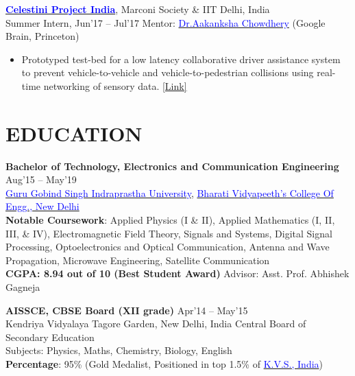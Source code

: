 \documentclass[11pt]{res} %
\newcommand{\titlegap}{5pt} %
\newcommand{\sectgap}{0.05in} %
\begin{document}
\begin{resume}
\vspace{-0.1cm}
\href{https://www.marconisociety.org/programs-services/}{\textbf{\textcolor{blue}{Celestini Project India}}}, Marconi Society \& IIT Delhi, India\\
Summer Intern, Jun'17 – Jul'17 \hfill Mentor: \href{https://achowdhery.github.io/achowdhery-website/index.html}{\textcolor{blue}{Dr.Aakanksha Chowdhery}} (Google Brain, Princeton)
\begin{itemize}
\item Prototyped test-bed for a low latency collaborative driver assistance system to prevent vehicle-to-vehicle and vehicle-to-pedestrian collisions using real-time networking of sensory data. \textcolor{blue}{\href{https://bhartischool.iitd.ac.in/pdf/7thISSUEnewsletter.pdf}{[Link]}}
\end{itemize}


\vspace{\sectgap}
\hline


\section{EDUCATION} %

\vspace{\titlegap}

{\bf Bachelor of Technology, Electronics and Communication Engineering} \hfill Aug'15 -- May'19 \\ 
\href{http://www.ipu.ac.in/}{\textcolor{blue}{Guru Gobind Singh Indraprastha University}}, \href{http://bvcoend.ac.in}{\textcolor{blue}{Bharati Vidyapeeth's College Of Engg., New Delhi}}\\
\textbf{Notable Coursework}: Applied Physics (I \& II), Applied Mathematics (I, II, III, \& IV), Electromagnetic Field Theory, Signals and Systems, Digital Signal Processing, Optoelectronics and Optical Communication, Antenna and Wave Propagation, Microwave Engineering, Satellite Communication \\
\textbf{CGPA: 8.94 out of 10 (Best Student Award)} \hspace{0.2in}
\hfill Advisor: Asst. Prof. Abhishek Gagneja

{\bf AISSCE, CBSE Board (XII grade)} \hfill Apr'14 -- May'15 \\ 
Kendriya Vidyalaya Tagore Garden, New Delhi, India \hfill Central Board of Secondary Education\\ 
Subjects: Physics, Maths, Chemistry, Biology, English\\
\textbf{Percentage}: 95\% (Gold Medalist, Positioned in top 1.5\% of \href{https://kvsangathan.nic.in/}{\textcolor{blue}{K.V.S., India}})


\end{resume}
\end{document}
